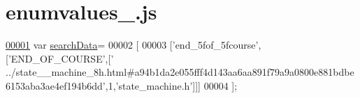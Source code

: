 \hypertarget{enumvalues__3_8js_source}{}\section{enumvalues\+\_.\+js}
\label{enumvalues__3_8js_source}

\begin{DoxyCode}
\hypertarget{enumvalues__3_8js_source.tex_l00001}{}\hyperlink{enumvalues__3_8js_ad01a7523f103d6242ef9b0451861231e}{00001} var \hyperlink{enumvalues__3_8js_ad01a7523f103d6242ef9b0451861231e}{searchData}=
00002 [
00003   [\textcolor{stringliteral}{'end\_5fof\_5fcourse'},[\textcolor{stringliteral}{'END\_OF\_COURSE'},[\textcolor{stringliteral}{'
      ../state\_\_machine\_8h.html#a94b1da2e055fff4d143aa6aa891f79a9a0800e881bdbe6153aba3ae4ef194b6dd'},1,\textcolor{stringliteral}{'state\_machine.h'}]]]
00004 ];
\end{DoxyCode}
